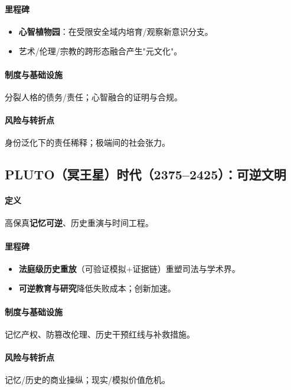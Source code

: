 \documentclass[11pt]{article}
\begin{document}
\paragraph{里程碑}
\begin{itemize}[noitemsep]
  \item \textbf{心智植物园}：在受限安全域内培育/观察新意识分支。
  \item 艺术/伦理/宗教的跨形态融合产生"元文化"。
\end{itemize}

\paragraph{制度与基础设施} 分裂人格的债务/责任；心智融合的证明与合规。

\paragraph{风险与转折点} 身份泛化下的责任稀释；极端间的社会张力。

\subsection{PLUTO（冥王星）时代（2375–2425）：可逆文明}
\paragraph{定义} 高保真\textbf{记忆可逆}、历史重演与时间工程。

\paragraph{里程碑}
\begin{itemize}[noitemsep]
  \item \textbf{法庭级历史重放}（可验证模拟+证据链）重塑司法与学术界。
  \item \textbf{可逆教育与研究}降低失败成本；创新加速。
\end{itemize}

\paragraph{制度与基础设施} 记忆产权、防篡改伦理、历史干预红线与补救措施。

\paragraph{风险与转折点} 记忆/历史的商业操纵；现实/模拟价值危机。
\end{document}
